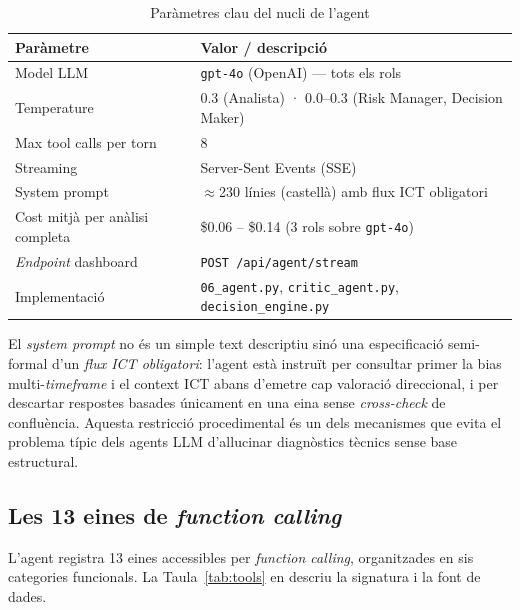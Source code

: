 \documentclass[12pt, a4paper]{report}
\begin{document}
\begin{table}[H]
\centering
\caption{Paràmetres clau del nucli de l'agent}
\label{tab:agent-config}
\begin{tabular}{@{}L{5cm}L{8cm}@{}}
\toprule
\textbf{Paràmetre} & \textbf{Valor / descripció} \\
\midrule
Model LLM                  & \texttt{gpt-4o} (OpenAI) --- tots els rols \\
Temperature                & 0.3 (Analista) · 0.0--0.3 (Risk Manager, Decision Maker) \\
Max tool calls per torn    & 8 \\
Streaming                  & Server-Sent Events (SSE) \\
System prompt              & $\approx$230 línies (castellà) amb flux ICT obligatori \\
Cost mitjà per anàlisi completa & \$0.06 -- \$0.14 (3 rols sobre \texttt{gpt-4o}) \\
\textit{Endpoint} dashboard & \texttt{POST /api/agent/stream} \\
Implementació              & \texttt{06\_agent.py}, \texttt{critic\_agent.py}, \texttt{decision\_engine.py} \\
\bottomrule
\end{tabular}
\end{table}

El \textit{system prompt} no és un simple text descriptiu sinó una especificació semi-formal d'un \emph{flux ICT obligatori}: l'agent està instruït per consultar primer la bias multi-\textit{timeframe} i el context ICT abans d'emetre cap valoració direccional, i per descartar respostes basades únicament en una eina sense \emph{cross-check} de confluència. Aquesta restricció procedimental és un dels mecanismes que evita el problema típic dels agents LLM d'al\textperiodcentered{}lucinar diagnòstics tècnics sense base estructural.

\subsection{Les 13 eines de \textit{function calling}}

L'agent registra 13 eines accessibles per \textit{function calling}, organitzades en sis categories funcionals. La Taula~\ref{tab:tools} en descriu la signatura i la font de dades.
\end{document}
